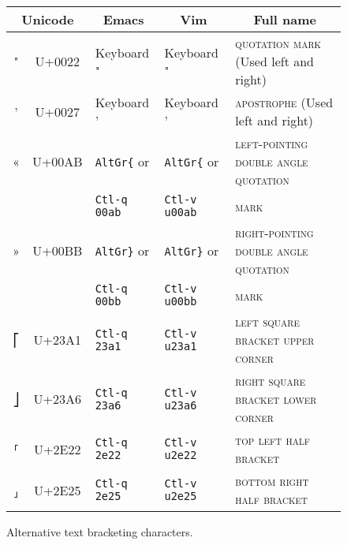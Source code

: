\documentclass[12pt]{article}
\newcommand{\newcolumn}{\vfill\eject}
\begin{document}
\begin{figure}[ht]
\begin{center}
\begin{tabular}{|c|c|p{0.15\LinePrinterwidth}|p{0.17\LinePrinterwidth}|p{0.6\LinePrinterwidth}|}
\hline
\multicolumn{2}{|c|}{Unicode} & \multicolumn{1}{|c|}{Emacs}
                                 & \multicolumn{1}{|c|}{Vim} & \multicolumn{1}{|c|}{Full name} \\ \hline\hline
" & U+0022 & Keyboard "          & Keyboard "           & \textsc{quotation mark} (Used left and right) \\ \hline
' & U+0027 & Keyboard '          & Keyboard '           & \textsc{apostrophe} (Used left and right) \\ \hline
« & U+00AB & \texttt{AltGr\{} or & \texttt{AltGr\{} or  & \textsc{left-pointing double angle quotation} \\
  &        & \texttt{Ctl-q 00ab} & \texttt{Ctl-v u00ab} & \textsc{mark} \\ \hline
» & U+00BB & \texttt{AltGr\}} or & \texttt{AltGr\}} or  & \textsc{right-pointing double angle quotation} \\
  &        & \texttt{Ctl-q 00bb} & \texttt{Ctl-v u00bb} & \textsc{mark} \\ \hline
⎡ & U+23A1 & \texttt{Ctl-q 23a1} & \texttt{Ctl-v u23a1} & \textsc{left square bracket upper corner} \\ \hline
⎦ & U+23A6 & \texttt{Ctl-q 23a6} & \texttt{Ctl-v u23a6} & \textsc{right square bracket lower corner} \\ \hline
⸢ & U+2E22 & \texttt{Ctl-q 2e22} & \texttt{Ctl-v u2e22} & \textsc{top left half bracket} \\ \hline
⸥ & U+2E25 & \texttt{Ctl-q 2e25} & \texttt{Ctl-v u2e25} & \textsc{bottom right half bracket} \\ \hline
\end{tabular}
\caption{Alternative text bracketing characters.\label{fig:brackets}}
\end{center}
\end{figure}

\vspace*{\fill}

\begin{center}
\end{center}

\vspace*{\fill}


\newcolumn
\end{document}

